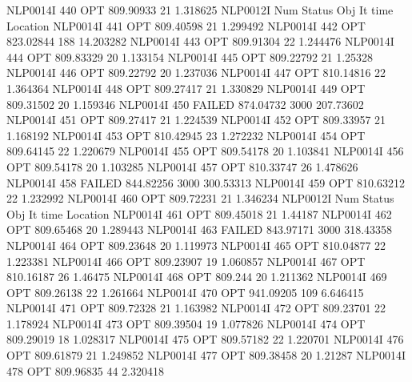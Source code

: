 NLP0014I           440         OPT 809.90933       21 1.318625
NLP0012I 
              Num      Status      Obj             It       time                 Location
NLP0014I           441         OPT 809.40598       21 1.299492
NLP0014I           442         OPT 823.02844      188 14.203282
NLP0014I           443         OPT 809.91304       22 1.244476
NLP0014I           444         OPT 809.83329       20 1.133154
NLP0014I           445         OPT 809.22792       21 1.25328
NLP0014I           446         OPT 809.22792       20 1.237036
NLP0014I           447         OPT 810.14816       22 1.364364
NLP0014I           448         OPT 809.27417       21 1.330829
NLP0014I           449         OPT 809.31502       20 1.159346
NLP0014I           450      FAILED 874.04732     3000 207.73602
NLP0014I           451         OPT 809.27417       21 1.224539
NLP0014I           452         OPT 809.33957       21 1.168192
NLP0014I           453         OPT 810.42945       23 1.272232
NLP0014I           454         OPT 809.64145       22 1.220679
NLP0014I           455         OPT 809.54178       20 1.103841
NLP0014I           456         OPT 809.54178       20 1.103285
NLP0014I           457         OPT 810.33747       26 1.478626
NLP0014I           458      FAILED 844.82256     3000 300.53313
NLP0014I           459         OPT 810.63212       22 1.232992
NLP0014I           460         OPT 809.72231       21 1.346234
NLP0012I 
              Num      Status      Obj             It       time                 Location
NLP0014I           461         OPT 809.45018       21 1.44187
NLP0014I           462         OPT 809.65468       20 1.289443
NLP0014I           463      FAILED 843.97171     3000 318.43358
NLP0014I           464         OPT 809.23648       20 1.119973
NLP0014I           465         OPT 810.04877       22 1.223381
NLP0014I           466         OPT 809.23907       19 1.060857
NLP0014I           467         OPT 810.16187       26 1.46475
NLP0014I           468         OPT 809.244       20 1.211362
NLP0014I           469         OPT 809.26138       22 1.261664
NLP0014I           470         OPT 941.09205      109 6.646415
NLP0014I           471         OPT 809.72328       21 1.163982
NLP0014I           472         OPT 809.23701       22 1.178924
NLP0014I           473         OPT 809.39504       19 1.077826
NLP0014I           474         OPT 809.29019       18 1.028317
NLP0014I           475         OPT 809.57182       22 1.220701
NLP0014I           476         OPT 809.61879       21 1.249852
NLP0014I           477         OPT 809.38458       20 1.21287
NLP0014I           478         OPT 809.96835       44 2.320418
